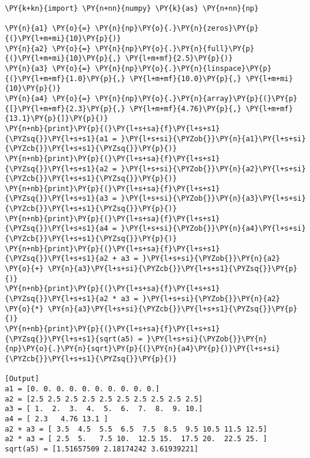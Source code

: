 \begin{Verbatim}[label=\makebox{\href{https://bitbucket.org/lbaldini/statnotes/src/master/snippets/numpy\_arrays.py}{https://bitbucket.org/.../numpy\_arrays.py}},commandchars=\\\{\}]
\PY{k+kn}{import} \PY{n+nn}{numpy} \PY{k}{as} \PY{n+nn}{np}

\PY{n}{a1} \PY{o}{=} \PY{n}{np}\PY{o}{.}\PY{n}{zeros}\PY{p}{(}\PY{l+m+mi}{10}\PY{p}{)}
\PY{n}{a2} \PY{o}{=} \PY{n}{np}\PY{o}{.}\PY{n}{full}\PY{p}{(}\PY{l+m+mi}{10}\PY{p}{,} \PY{l+m+mf}{2.5}\PY{p}{)}
\PY{n}{a3} \PY{o}{=} \PY{n}{np}\PY{o}{.}\PY{n}{linspace}\PY{p}{(}\PY{l+m+mf}{1.0}\PY{p}{,} \PY{l+m+mf}{10.0}\PY{p}{,} \PY{l+m+mi}{10}\PY{p}{)}
\PY{n}{a4} \PY{o}{=} \PY{n}{np}\PY{o}{.}\PY{n}{array}\PY{p}{(}\PY{p}{[}\PY{l+m+mf}{2.3}\PY{p}{,} \PY{l+m+mf}{4.76}\PY{p}{,} \PY{l+m+mf}{13.1}\PY{p}{]}\PY{p}{)}
\PY{n+nb}{print}\PY{p}{(}\PY{l+s+sa}{f}\PY{l+s+s1}{\PYZsq{}}\PY{l+s+s1}{a1 = }\PY{l+s+si}{\PYZob{}}\PY{n}{a1}\PY{l+s+si}{\PYZcb{}}\PY{l+s+s1}{\PYZsq{}}\PY{p}{)}
\PY{n+nb}{print}\PY{p}{(}\PY{l+s+sa}{f}\PY{l+s+s1}{\PYZsq{}}\PY{l+s+s1}{a2 = }\PY{l+s+si}{\PYZob{}}\PY{n}{a2}\PY{l+s+si}{\PYZcb{}}\PY{l+s+s1}{\PYZsq{}}\PY{p}{)}
\PY{n+nb}{print}\PY{p}{(}\PY{l+s+sa}{f}\PY{l+s+s1}{\PYZsq{}}\PY{l+s+s1}{a3 = }\PY{l+s+si}{\PYZob{}}\PY{n}{a3}\PY{l+s+si}{\PYZcb{}}\PY{l+s+s1}{\PYZsq{}}\PY{p}{)}
\PY{n+nb}{print}\PY{p}{(}\PY{l+s+sa}{f}\PY{l+s+s1}{\PYZsq{}}\PY{l+s+s1}{a4 = }\PY{l+s+si}{\PYZob{}}\PY{n}{a4}\PY{l+s+si}{\PYZcb{}}\PY{l+s+s1}{\PYZsq{}}\PY{p}{)}
\PY{n+nb}{print}\PY{p}{(}\PY{l+s+sa}{f}\PY{l+s+s1}{\PYZsq{}}\PY{l+s+s1}{a2 + a3 = }\PY{l+s+si}{\PYZob{}}\PY{n}{a2} \PY{o}{+} \PY{n}{a3}\PY{l+s+si}{\PYZcb{}}\PY{l+s+s1}{\PYZsq{}}\PY{p}{)}
\PY{n+nb}{print}\PY{p}{(}\PY{l+s+sa}{f}\PY{l+s+s1}{\PYZsq{}}\PY{l+s+s1}{a2 * a3 = }\PY{l+s+si}{\PYZob{}}\PY{n}{a2} \PY{o}{*} \PY{n}{a3}\PY{l+s+si}{\PYZcb{}}\PY{l+s+s1}{\PYZsq{}}\PY{p}{)}
\PY{n+nb}{print}\PY{p}{(}\PY{l+s+sa}{f}\PY{l+s+s1}{\PYZsq{}}\PY{l+s+s1}{sqrt(a5) = }\PY{l+s+si}{\PYZob{}}\PY{n}{np}\PY{o}{.}\PY{n}{sqrt}\PY{p}{(}\PY{n}{a4}\PY{p}{)}\PY{l+s+si}{\PYZcb{}}\PY{l+s+s1}{\PYZsq{}}\PY{p}{)}

[Output]
a1 = [0. 0. 0. 0. 0. 0. 0. 0. 0. 0.]
a2 = [2.5 2.5 2.5 2.5 2.5 2.5 2.5 2.5 2.5 2.5]
a3 = [ 1.  2.  3.  4.  5.  6.  7.  8.  9. 10.]
a4 = [ 2.3   4.76 13.1 ]
a2 + a3 = [ 3.5  4.5  5.5  6.5  7.5  8.5  9.5 10.5 11.5 12.5]
a2 * a3 = [ 2.5  5.   7.5 10.  12.5 15.  17.5 20.  22.5 25. ]
sqrt(a5) = [1.51657509 2.18174242 3.61939221]
\end{Verbatim}